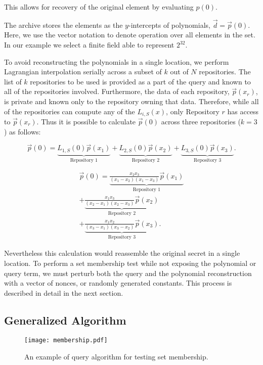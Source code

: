 This allows for recovery of the original element by evaluating
$p(0)$.

The archive stores the elements as the $y$-intercepts of polynomials,
$\vec{d}=\vec{p}(0)$.  Here, we use the vector notation to denote operation 
over all elements in the set. In our example we
select a finite field able to represent $2^{32}$.

To avoid reconstructing the polynomials in a single location, we
perform Lagrangian interpolation serially across a subset of $k$ out
of $N$ repositories.  The list of $k$ repositories to be used is
provided as a part of the \SIF query and known to all of the
repositories involved.  Furthermore, the data of each repository,
$\vec{p}(x_r)$, is private and known only to the repository owning
that data. Therefore, while all of the repositories can compute any of
the $L_{i, S}(x)$, only Repository $r$ has access to $\vec{p
}(x_r)$. Thus it is possible to calculate $\vec{p}(0)$ across three
repositories ($k=3$) as follows:

\[
\vec{p}(0) = \underbrace{L_{1, S}(0) \vec{p}(x_1)}_{\text{Repository 1}} +
 \underbrace{L_{2,S}(0) \vec{p}(x_2)}_{\text{Repository 2}} +
 \underbrace{L_{3,S}(0) \vec{p}(x_3)}_{\text{Repository 3}}.
\]

\begin{multline*}
\vec{p}(0) = \underbrace{\frac{x_2 x_3}{(x_1-x_2)(x_1-x_3)} \vec{p}(x_1)}_{\text{Repository 1}}\\
+ \underbrace{\frac{x_1 x_3}{(x_2-x_1)(x_2-x_3)} \vec{p}(x_2)}_{\text{Repository 2}}\\
+ \underbrace{\frac{x_1 x_2}{(x_3-x_1)(x_3-x_2)} \vec{p}(x_3)}_{\text{Repository 3}}.
\end{multline*}

Nevertheless this calculation would reassemble the original secret in
a single location. To perform a set membership test while not exposing the
polynomial or query term, we must perturb both the query and the
polynomial reconstruction with a vector of nonces, or randomly generated
constants. This process is described in 
detail in the next section.

\subsection{Generalized Algorithm}\label{ssec:sif:general}

\begin{figure}[t]
\begin{center}
\begin{adjustbox}{max totalsize={0.95\columnwidth}{0.95\columnwidth},center}
\texttt{[image: membership.pdf]}
\end{adjustbox}
\end{center}
\caption{An example of query algorithm for testing set membership.}
\label{fig:query}
\end{figure}

